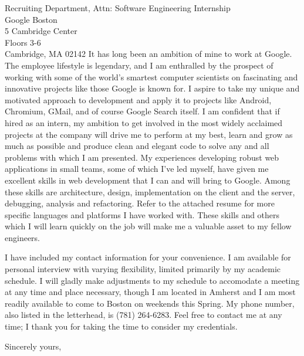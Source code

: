 \documentclass{letter} %
\begin{document}
\begin{letter}{Recruiting Department, Attn: Software Engineering Internship \\
Google Boston \\
5 Cambridge Center \\
Floors 3-6 \\
Cambridge, MA 02142}
\noindent It has long been an ambition of mine to work at Google.  The employee lifestyle is legendary, and I am enthralled by the prospect of working with some of the world's smartest computer scientists on fascinating and innovative projects like those Google is known for.  I aspire to take my unique and motivated approach to development and apply it to projects like Android, Chromium, GMail, and of course Google Search itself.  I am confident that if hired as an intern, my ambition to get involved in the most widely acclaimed projects at the company will drive me to perform at my best, learn and grow as much as possible and produce clean and elegant code to solve any and all problems with which I am presented.  My experiences developing robust web applications in small teams, some of which I've led myself, have given me excellent skills in web development that I can and will bring to Google.  Among these skills are architecture, design, implementation on the client and the server, debugging, analysis and refactoring.  Refer to the attached resume for more specific languages and platforms I have worked with.  These skills and others which I will learn quickly on the job will make me a valuable asset to my fellow engineers.


\noindent I have included my contact information for your convenience.  I am available for personal interview with varying flexibility, limited primarily by my academic schedule.  I will gladly make adjustments to my schedule to accomodate a meeting at any time and place necessary, though I am located in Amherst and I am most readily available to come to Boston on weekends this Spring.  My phone number, also listed in the letterhead, is (781) 264-6283.  Feel free to contact me at any time; I thank you for taking the time to consider my credentials.
 
\closing{Sincerely yours,} 
 

 

\end{letter}
 
\end{document}
